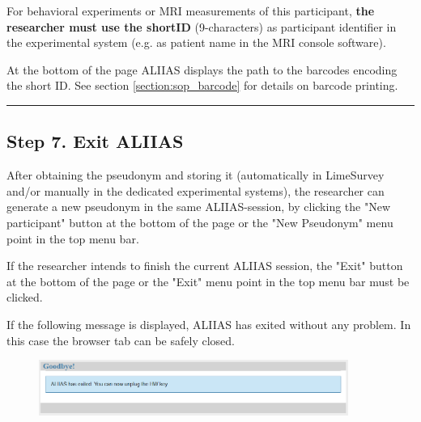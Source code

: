 For behavioral experiments or MRI measurements of this participant, \textbf{the researcher must use the shortID} (9-characters) as participant identifier in the experimental system (e.g. as patient name in the MRI console software).

At the bottom of the page ALIIAS displays the path to the barcodes encoding the short ID. See section \ref{section:sop_barcode} for details on barcode printing.

\par\noindent\rule{\textwidth\color{pniblue}}{0.4pt}
\subsection*{Step 7. Exit ALIIAS}

After obtaining the pseudonym and storing it (automatically in LimeSurvey and/or manually in the dedicated experimental systems), the researcher can generate a new pseudonym in the same ALIIAS-session, by clicking the "New participant" button at the bottom of the page or the "New Pseudonym" menu point in the top menu bar.

If the researcher intends to finish the current ALIIAS session, the "Exit" button at the bottom of the page or the "Exit" menu point in the top menu bar must be clicked.

If the following message is displayed, ALIIAS has exited without any problem. In this case the browser tab can be safely closed.

\begin{figure}[H]
\includegraphics[width=0.9\textwidth]{docs/fig/08_exit.PNG}
\end{figure}

\small\setlength\fboxsep{5pt}\setlength\fboxrule{1pt}
\large
